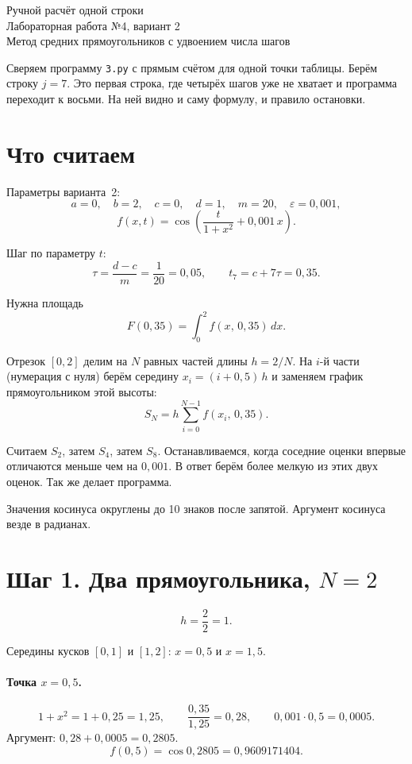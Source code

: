 \documentclass[11pt,a4paper]{article}
\begin{document}
\begin{center}
{\Large Ручной расчёт одной строки}\\[0.4em]
{\large Лабораторная работа №4, вариант 2}\\[0.2em]
Метод средних прямоугольников с удвоением числа шагов
\end{center}

Сверяем программу \texttt{3.py} с прямым счётом для одной точки таблицы.
Берём строку \(j = 7\). Это первая строка, где четырёх шагов уже не хватает
и программа переходит к восьми. На ней видно и саму формулу, и правило остановки.

\section*{Что считаем}

Параметры варианта~2:
\[
a = 0,\quad b = 2,\quad c = 0,\quad d = 1,\quad m = 20,\quad \varepsilon = 0{,}001,
\]
\[
f(x, t) = \cos\left(\frac{t}{1 + x^{2}} + 0{,}001\, x\right).
\]

Шаг по параметру \(t\):
\[
\tau = \frac{d - c}{m} = \frac{1}{20} = 0{,}05,
\qquad
t_{7} = c + 7\tau = 0{,}35.
\]

Нужна площадь
\[
F(0{,}35) = \int_{0}^{2} f(x,\, 0{,}35)\, dx.
\]

Отрезок \([0, 2]\) делим на \(N\) равных частей длины \(h = 2/N\).
На \(i\)-й части (нумерация с нуля) берём середину
\(x_{i} = (i + 0{,}5)\, h\) и заменяем график прямоугольником этой высоты:
\[
S_{N} = h \sum_{i=0}^{N-1} f(x_{i},\, 0{,}35).
\]

Считаем \(S_{2}\), затем \(S_{4}\), затем \(S_{8}\).
Останавливаемся, когда соседние оценки впервые отличаются меньше чем на \(0{,}001\).
В ответ берём более мелкую из этих двух оценок. Так же делает программа.

Значения косинуса округлены до 10 знаков после запятой.
Аргумент косинуса везде в радианах.

\section*{Шаг 1. Два прямоугольника, \(N = 2\)}

\[
h = \frac{2}{2} = 1.
\]

Середины кусков \([0, 1]\) и \([1, 2]\): \(x = 0{,}5\) и \(x = 1{,}5\).

\paragraph{Точка \(x = 0{,}5\).}
\[
1 + x^{2} = 1 + 0{,}25 = 1{,}25,
\qquad
\frac{0{,}35}{1{,}25} = 0{,}28,
\qquad
0{,}001 \cdot 0{,}5 = 0{,}0005.
\]
Аргумент: \(0{,}28 + 0{,}0005 = 0{,}2805\).
\[
f(0{,}5) = \cos 0{,}2805 = 0{,}9609171404.
\]
\end{document}
